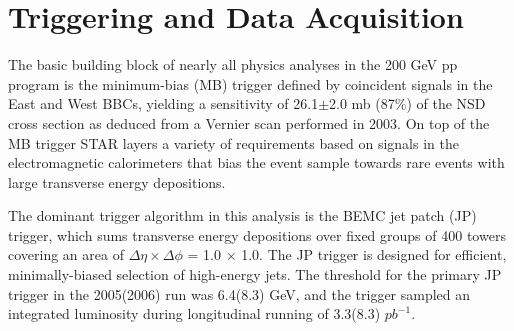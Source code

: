 \section{Triggering and Data Acquisition}

The basic building block of nearly all physics analyses in the 200 GeV pp program is the minimum-bias (MB) trigger defined by coincident signals in the East and West BBCs, yielding a sensitivity of 26.1$\pm$2.0 mb (87\%) of the NSD cross section as deduced from a Vernier scan performed in 2003. On top of the MB trigger STAR layers a variety of requirements based on signals in the electromagnetic calorimeters that bias the event sample towards rare events with large transverse energy depositions.

The dominant trigger algorithm in this analysis is the BEMC jet patch (JP) trigger, which sums transverse energy depositions over fixed groups of 400 towers covering an area of $\Delta \eta \times \Delta \phi$ = 1.0 $\times$ 1.0.  The JP trigger is designed for efficient, minimally-biased selection of high-energy jets.  The threshold for the primary JP trigger in the 2005(2006) run was 6.4(8.3) GeV, and the trigger sampled an integrated luminosity during longitudinal running of 3.3(8.3) $pb^{-1}$.







